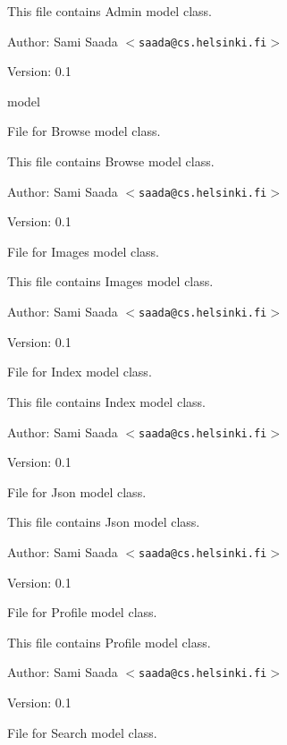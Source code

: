 This file contains Admin model class. \begin{Desc}
\item[Author:]Sami Saada $<${\tt saada@cs.helsinki.fi}$>$ \end{Desc}
\begin{Desc}
\item[Version:]0.1\end{Desc}
model

File for Browse model class.

This file contains Browse model class. \begin{Desc}
\item[Author:]Sami Saada $<${\tt saada@cs.helsinki.fi}$>$ \end{Desc}
\begin{Desc}
\item[Version:]0.1\end{Desc}
File for Images model class.

This file contains Images model class. \begin{Desc}
\item[Author:]Sami Saada $<${\tt saada@cs.helsinki.fi}$>$ \end{Desc}
\begin{Desc}
\item[Version:]0.1\end{Desc}
File for Index model class.

This file contains Index model class. \begin{Desc}
\item[Author:]Sami Saada $<${\tt saada@cs.helsinki.fi}$>$ \end{Desc}
\begin{Desc}
\item[Version:]0.1\end{Desc}
File for Json model class.

This file contains Json model class. \begin{Desc}
\item[Author:]Sami Saada $<${\tt saada@cs.helsinki.fi}$>$ \end{Desc}
\begin{Desc}
\item[Version:]0.1\end{Desc}
File for Profile model class.

This file contains Profile model class. \begin{Desc}
\item[Author:]Sami Saada $<${\tt saada@cs.helsinki.fi}$>$ \end{Desc}
\begin{Desc}
\item[Version:]0.1\end{Desc}
File for Search model class.

